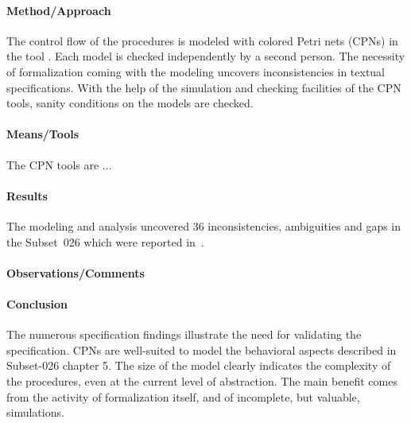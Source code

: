 \paragraph{Method/Approach}
The control flow of the procedures is modeled with colored Petri nets
(CPNs) in the tool \cite{Westergaard2013apn}. Each model is checked
independently by a second person. The necessity of formalization
coming with the modeling uncovers inconsistencies in textual
specifications. With the help of the simulation and checking
facilities of the CPN tools, sanity conditions on the models are
checked.

\paragraph{Means/Tools}
The CPN tools are ...

\paragraph{Results}
The modeling and analysis uncovered 36 inconsistencies, ambiguities
and gaps in the Subset~026 which were reported
in~\cite{specfindings}. 

\paragraph{Observations/Comments}


\paragraph{Conclusion}

The numerous specification findings illustrate the need for validating
the specification. CPNs are well-suited to model the behavioral
aspects described in Subset-026 chapter 5. The size of the model
clearly indicates the complexity of the procedures, even at the
current level of abstraction. The main benefit comes from the
activity of formalization itself, and of incomplete, but valuable,
simulations. 
